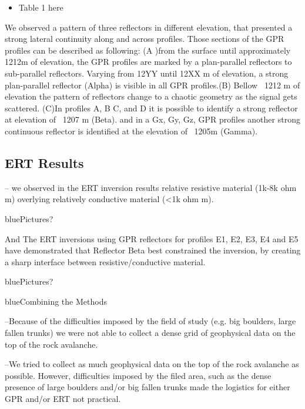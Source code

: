 \documentclass[5p]{elsarticle}
\newcommand{\COMON}{\begin{color}{blue}}
\newcommand{\COMOFF}{\end{color}}
\begin{document}
\begin{itemize}
    \item Table 1 here
\end{itemize}			   



We observed a pattern of three reflectors in different elevation, that presented a strong lateral continuity along and across profiles. Those sections of the GPR profiles can be described as following: (A )from the surface until approximately 1212m of elevation, the GPR profiles are marked by a plan-parallel reflectors to sub-parallel reflectors. Varying from 12YY until 12XX m of elevation, a strong plan-parallel reflector (Alpha) is visible in all GPR profiles.(B) Bellow ~1212 m of elevation the pattern of reflectors change to a chaotic geometry as the signal gets scattered. (C)In profiles A, B C, and D it is possible to identify a strong reflector at elevation of ~1207 m (Beta). and in a Gx,  Gy, Gz, GPR profiles another strong continuous reflector is identified at the elevation of ~1205m (Gamma).
								   
								   
								   
\subsection{ERT Results}

– we observed  in the ERT inversion results relative resistive material (1k-8k ohm m) overlying relatively conductive material (<1k ohm m).

\COMON Pictures? \COMOFF

And The ERT inversions using GPR reflectors for profiles E1, E2, E3, E4 and E5 have demonstrated that Reflector Beta best constrained the inversion, by creating a sharp interface between resistive/conductive material.


\COMON Pictures? \COMOFF


\COMON Combining the Methods \COMOFF


--Because of the difficulties imposed by the field of study (e.g. big boulders,  large fallen trunks) we were not able to collect a dense grid of geophysical data on the top of the rock avalanche. 

--We tried to collect as much geophysical data on the top of the rock avalanche as possible. However, difficulties imposed by the filed area, such as the dense presence of large boulders and/or big fallen trunks made the logistics for either GPR and/or ERT not practical. 
\end{document}

